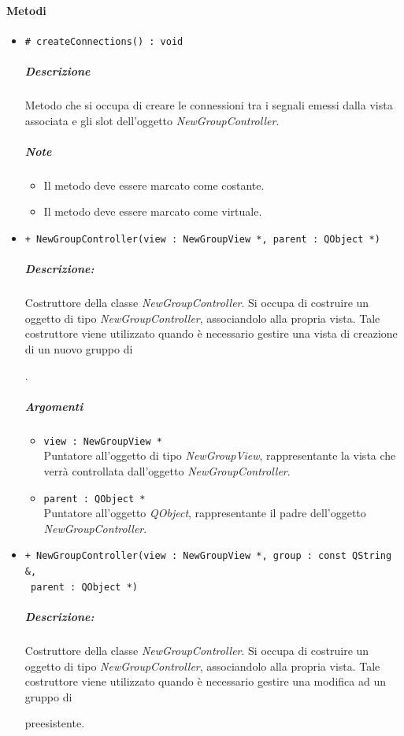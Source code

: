 	\paragraph{\color{black}Metodi}
		\begin{itemize}
			\item \color{blue} \verb!# createConnections() : void!
			\color{black}
			\subparagraph{Descrizione} Metodo che si occupa di creare le connessioni tra i segnali emessi dalla vista associata e gli slot\g{} dell'oggetto \textsl{NewGroupController}.
			\subparagraph{Note}
			\begin{itemize}
				\item Il metodo deve essere marcato come costante.
				\item Il metodo deve essere marcato come virtuale.
			\end{itemize}
			\item \color{blue} \verb!+ NewGroupController(view : NewGroupView *, parent : QObject *)!
			\color{black}
			\subparagraph{Descrizione:} Costruttore della classe \textsl{NewGroupController}. Si occupa di costruire un oggetto di tipo \textsl{NewGroupController}, associandolo alla propria vista. Tale costruttore viene utilizzato quando è necessario gestire una vista di creazione di un nuovo gruppo di \subject{}.
			\color{black}
			\subparagraph{Argomenti}
			\begin{itemize}
				\item \color{RoyalPurple} \verb!view : NewGroupView *!\\				
\color{black} Puntatore all'oggetto di tipo \textsl{NewGroupView}, rappresentante la vista che verrà controllata dall'oggetto \textsl{NewGroupController}.
				\item \color{RoyalPurple} \verb!parent : QObject *!\\				
\color{black} Puntatore all'oggetto \textsl{QObject}, rappresentante il padre dell'oggetto \textsl{NewGroupController}.
			\end{itemize}
			\item \color{blue} \verb!+ NewGroupController(view : NewGroupView *, group : const QString &,! \\ \verb! parent : QObject *)!
			\color{black}
			\subparagraph{Descrizione:} Costruttore della classe \textsl{NewGroupController}. Si occupa di costruire un oggetto di tipo \textsl{NewGroupController}, associandolo alla propria vista. Tale costruttore viene utilizzato quando è necessario gestire una modifica ad un gruppo di \subject{} preesistente.
			\color{black}

\end{itemize}
